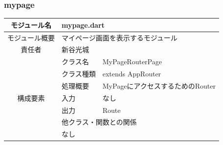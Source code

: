
\clearpage

\subsubsection{mypage}
\begin{longtable}{|c|l|l|}
  \endfirsthead
  \hline
  モジュール名                & \multicolumn{2}{l|}{mypage.dart}                                                                                                                    \\ \hline
  モジュール概要               & \multicolumn{2}{p{12cm}|}{マイページ画面を表示するモジュール}                                                                                                        \\ \hline
  責任者                   & \multicolumn{2}{l|}{新谷光城}                                                                                                                           \\ \hline
  \multirow{7}{*}{構成要素} & クラス名                                                                                         & MyPageRouterPage                                     \\ \cline{2-3}
                        & クラス種類                                                                                        & extends AppRouter                                    \\ \cline{2-3}
                        & 処理概要                                                                                         & \multicolumn{1}{p{12cm}|}{MyPageにアクセスするためのRouter}    \\ \cline{2-3}
                        & 入力                                                                                           & なし                                                   \\ \cline{2-3}
                        & 出力                                                                                           & Route                                                \\ \cline{2-3}
                        & \multicolumn{2}{l|}{他クラス・関数との関係}                                                                                                                    \\ \cline{2-3}
                        & \multicolumn{2}{p{14cm}|}{なし}                                                                                                                       \\ \hline

\end{longtable}
